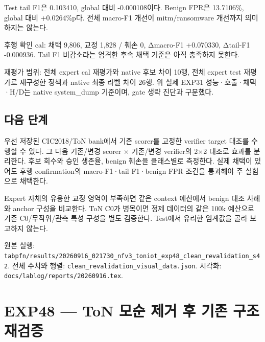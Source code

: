 Test tail F1은 0.103410, global 대비 -0.000108이다. Benign FPR은 13.7106\%, global 대비 +\allowbreak{}0.0264\%p다. 전체 macro-F1 개선이 mitm/\allowbreak{}ransomware 개선까지 의미하지는 않는다.

후행 확인 cal: 채택 9,806, 교정 1,828 /\allowbreak{} 훼손 0, Δmacro-F1 +\allowbreak{}0.070330, Δtail-F1 -0.000936. Tail F1 비감소라는 엄격한 후속 채택 기준은 아직 충족하지 못한다.

재평가 범위: 전체 expert cal 재평가와 native 후보 차이 10행, 전체 expert test 재평가로 재구성한 정책과 native 최종 라벨 차이 26행. 위 실제 EXP31 성능·호출·채택·H/\allowbreak{}D는 native system\_\allowbreak{}dump 기준이며, gate 생략 진단과 구분했다.

\subsection{다음 단계}
우선 저장된 CIC2018/\allowbreak{}ToN bank에서 기존 scorer를 고정한 verifier target 대조를 수행할 수 있다. 그 다음 기존/\allowbreak{}변경 scorer × 기존/\allowbreak{}변경 verifier의 2×2 대조로 효과를 분리한다. 후보 회수와 승인 생존율, benign 훼손을 클래스별로 측정한다. 실제 채택이 있어도 후행 confirmation의 macro-F1·tail F1·benign FPR 조건을 통과해야 주 실험으로 채택한다.

Expert 자체의 유용한 교정 영역이 부족하면 같은 context 예산에서 benign 대조 사례와 anchor 구성을 비교한다. ToN C0가 병목이면 정제 데이터의 같은 100k 예산으로 기존 C0/\allowbreak{}무작위/\allowbreak{}관측 특성 구성을 별도 검증한다. Test에서 유리한 임계값을 골라 보고하지 않는다.

원본 실행: \texttt{tabpfn/\allowbreak{}\allowbreak{}r\allowbreak{}esults/\allowbreak{}\allowbreak{}2\allowbreak{}0260916\_\allowbreak{}\allowbreak{}021730\_\allowbreak{}\allowbreak{}n\allowbreak{}fv3\_\allowbreak{}\allowbreak{}toni\allowbreak{}ot\_\allowbreak{}\allowbreak{}exp48\allowbreak{}\_\allowbreak{}\allowbreak{}clean\_\allowbreak{}\allowbreak{}r\allowbreak{}evalidat\allowbreak{}ion\_\allowbreak{}\allowbreak{}s42}. 전체 수치와 행렬: \texttt{clean\_\allowbreak{}\allowbreak{}re\allowbreak{}validati\allowbreak{}on\_\allowbreak{}\allowbreak{}visua\allowbreak{}l\_\allowbreak{}\allowbreak{}data.\allowbreak{}j\allowbreak{}son}. 시각화: \texttt{docs/\allowbreak{}\allowbreak{}lab\allowbreak{}log/\allowbreak{}\allowbreak{}repo\allowbreak{}rts/\allowbreak{}\allowbreak{}2026\allowbreak{}0916.\allowbreak{}tex\allowbreak{}}.



\section{EXP48 — ToN 모순 제거 후 기존 구조 재검증}
